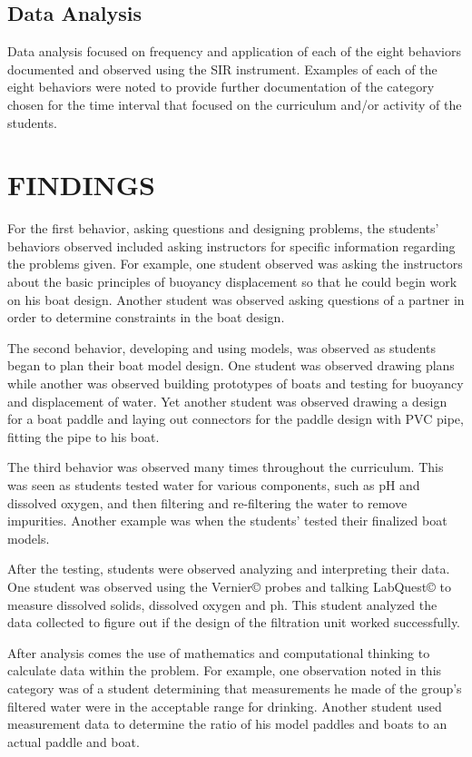 \documentclass[11.5pt]{sig-alternate} %
\begin{document}
\begin{large}
\subsection*{Data Analysis}

Data analysis focused on frequency and application of each of the eight behaviors documented and observed using the SIR instrument. Examples of each of the eight behaviors were noted to provide further documentation of the category chosen for the time interval that focused on the curriculum and/or activity of the students.  

\section*{FINDINGS}

For the first behavior, asking questions and designing problems, the students’ behaviors observed included asking instructors for specific information regarding the problems given. For example, one student observed was asking the instructors about the basic principles of buoyancy displacement so that he could begin work on his boat design. Another student was observed asking questions of a partner in order to determine constraints in the boat design.

The second behavior, developing and using models, was observed as students began to plan their boat model design. One student was observed drawing plans while another was observed building prototypes of boats and testing for buoyancy and displacement of water. Yet another student was observed drawing a design for a boat paddle and laying out connectors for the paddle design with PVC pipe, fitting the pipe to his boat.

The third behavior was observed many times throughout the curriculum. This was seen as students tested water for various components, such as pH and dissolved oxygen, and then filtering and re-filtering the water to remove impurities. Another example was when the students’ tested their finalized boat models.

After the testing, students were observed analyzing and interpreting their data. One student was observed using the Vernier© probes and talking LabQuest© to measure dissolved solids, dissolved oxygen and ph. This student analyzed the data collected to figure out if the design of the filtration unit worked successfully.

After analysis comes the use of mathematics and computational thinking to calculate data within the problem. For example, one observation noted in this category was of a student determining that measurements he made of the group’s filtered water were in the acceptable range for drinking. Another student used measurement data to determine the ratio of his model paddles and boats to an actual paddle and boat.  


\end{large}
\end{document}
